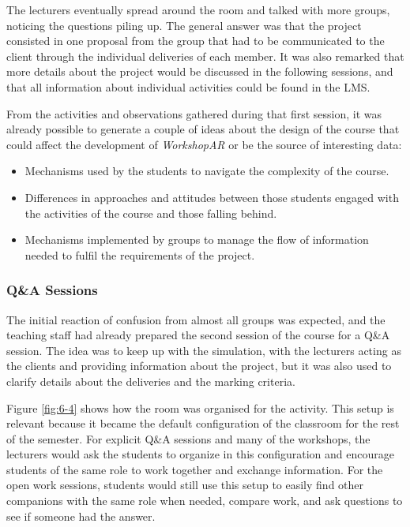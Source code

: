 The lecturers eventually spread around the room and talked with more groups, noticing the questions piling up. The general answer was that the project consisted in one
proposal from the group that had to be communicated to the client through the individual deliveries of each member. It was also remarked that more details about the project
would be discussed in the following sessions, and that all information about individual activities could be found in the \ac{LMS}.

From the activities and observations gathered during that first session, it was already possible to generate a couple of ideas about the design of the course that could
affect the development of \emph{WorkshopAR} or be the source of interesting data:

\begin{itemize}
    \item Mechanisms used by the students to navigate the complexity of the course.
    \item Differences in approaches and attitudes between those students engaged with the activities of the course and those falling behind.
    \item Mechanisms implemented by groups to manage the flow of information needed to fulfil the requirements of the project.
\end{itemize}

\subsubsection{Q\&A Sessions \label{sec:6-4-1-2}}

The initial reaction of confusion from almost all groups was expected, and the teaching staff had already prepared the second session of the course for a Q\&A session. The
idea was to keep up with the simulation, with the lecturers acting as the clients and providing information about the project, but it was also used to clarify details
about the deliveries and the marking criteria.

Figure \ref{fig:6-4} shows how the room was organised for the activity. This setup is relevant because it became the default configuration of the classroom for the rest of
the semester. For explicit Q\&A sessions and many of the workshops, the lecturers would ask the students to organize in this configuration and encourage students of the
same role to work together and exchange information. For the open work sessions, students would still use this setup to easily find other companions with the same role
when needed, compare work, and ask questions to see if someone had the answer.

